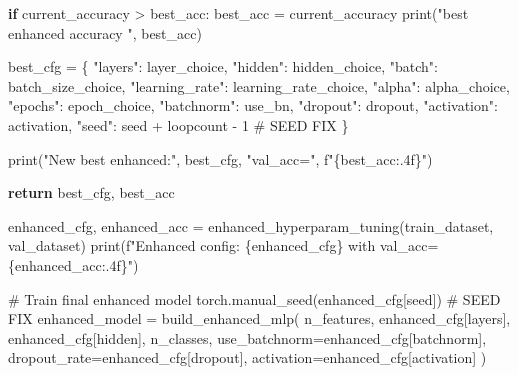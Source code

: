\documentclass[
  letterpaper,
  DIV=11,
  numbers=noendperiod]{scrartcl}
\newenvironment{Shaded}{\begin{snugshade}}{\end{snugshade}}
\newcommand{\BuiltInTok}[1]{\textcolor[rgb]{0.00,0.23,0.31}{#1}}
\newcommand{\CommentTok}[1]{\textcolor[rgb]{0.37,0.37,0.37}{#1}}
\newcommand{\ControlFlowTok}[1]{\textcolor[rgb]{0.00,0.23,0.31}{\textbf{#1}}}
\newcommand{\DecValTok}[1]{\textcolor[rgb]{0.68,0.00,0.00}{#1}}
\newcommand{\NormalTok}[1]{\textcolor[rgb]{0.00,0.23,0.31}{#1}}
\newcommand{\OperatorTok}[1]{\textcolor[rgb]{0.37,0.37,0.37}{#1}}
\newcommand{\SpecialCharTok}[1]{\textcolor[rgb]{0.37,0.37,0.37}{#1}}
\newcommand{\SpecialStringTok}[1]{\textcolor[rgb]{0.13,0.47,0.30}{#1}}
\newcommand{\StringTok}[1]{\textcolor[rgb]{0.13,0.47,0.30}{#1}}
\begin{document}
\begin{Shaded}
\begin{Highlighting}[]
        \ControlFlowTok{if}\NormalTok{ current\_accuracy }\OperatorTok{\textgreater{}}\NormalTok{ best\_acc:}
\NormalTok{            best\_acc }\OperatorTok{=}\NormalTok{ current\_accuracy}
            \BuiltInTok{print}\NormalTok{(}\StringTok{"best enhanced accuracy "}\NormalTok{, best\_acc)}

\NormalTok{            best\_cfg }\OperatorTok{=}\NormalTok{ \{}
                \StringTok{"layers"}\NormalTok{: layer\_choice,}
                \StringTok{"hidden"}\NormalTok{: hidden\_choice,}
                \StringTok{"batch"}\NormalTok{: batch\_size\_choice,}
                \StringTok{"learning\_rate"}\NormalTok{: learning\_rate\_choice,}
                \StringTok{"alpha"}\NormalTok{: alpha\_choice,}
                \StringTok{"epochs"}\NormalTok{: epoch\_choice,}
                \StringTok{"batchnorm"}\NormalTok{: use\_bn,}
                \StringTok{"dropout"}\NormalTok{: dropout,}
                \StringTok{"activation"}\NormalTok{: activation,}
                \StringTok{"seed"}\NormalTok{: seed }\OperatorTok{+}\NormalTok{ loopcount }\OperatorTok{{-}} \DecValTok{1}  \CommentTok{\# SEED FIX}
\NormalTok{            \}}

            \BuiltInTok{print}\NormalTok{(}\StringTok{"New best enhanced:"}\NormalTok{, best\_cfg, }\StringTok{"val\_acc="}\NormalTok{, }\SpecialStringTok{f"}\SpecialCharTok{\{}\NormalTok{best\_acc}\SpecialCharTok{:.4f\}}\SpecialStringTok{"}\NormalTok{)}

    \ControlFlowTok{return}\NormalTok{ best\_cfg, best\_acc}


\NormalTok{enhanced\_cfg, enhanced\_acc }\OperatorTok{=}\NormalTok{ enhanced\_hyperparam\_tuning(train\_dataset, val\_dataset)}
\BuiltInTok{print}\NormalTok{(}\SpecialStringTok{f"Enhanced config: }\SpecialCharTok{\{}\NormalTok{enhanced\_cfg}\SpecialCharTok{\}}\SpecialStringTok{ with val\_acc=}\SpecialCharTok{\{}\NormalTok{enhanced\_acc}\SpecialCharTok{:.4f\}}\SpecialStringTok{"}\NormalTok{)}

\CommentTok{\# Train final enhanced model}
\NormalTok{torch.manual\_seed(enhanced\_cfg[}\StringTok{\textquotesingle{}seed\textquotesingle{}}\NormalTok{]) }\CommentTok{\# SEED FIX}
\NormalTok{enhanced\_model }\OperatorTok{=}\NormalTok{ build\_enhanced\_mlp(}
\NormalTok{    n\_features,}
\NormalTok{    enhanced\_cfg[}\StringTok{\textquotesingle{}layers\textquotesingle{}}\NormalTok{],}
\NormalTok{    enhanced\_cfg[}\StringTok{\textquotesingle{}hidden\textquotesingle{}}\NormalTok{],}
\NormalTok{    n\_classes,}
\NormalTok{    use\_batchnorm}\OperatorTok{=}\NormalTok{enhanced\_cfg[}\StringTok{\textquotesingle{}batchnorm\textquotesingle{}}\NormalTok{],}
\NormalTok{    dropout\_rate}\OperatorTok{=}\NormalTok{enhanced\_cfg[}\StringTok{\textquotesingle{}dropout\textquotesingle{}}\NormalTok{],}
\NormalTok{    activation}\OperatorTok{=}\NormalTok{enhanced\_cfg[}\StringTok{\textquotesingle{}activation\textquotesingle{}}\NormalTok{]}
\NormalTok{)}


\end{Highlighting}
\end{Shaded}
\end{document}
